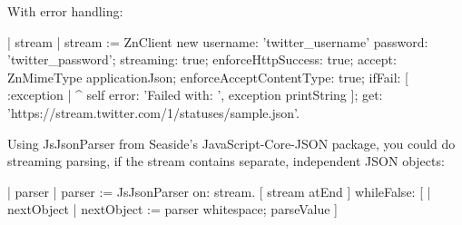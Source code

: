 \documentclass[a4paper,10pt,twoside]{book}
\begin{document}
With error handling:

\begin{code}
| stream |
stream := ZnClient new
	username: 'twitter_username' password: 'twitter_password';
	streaming: true;
	enforceHttpSuccess: true; 
	accept: ZnMimeType applicationJson;
	enforceAcceptContentType: true; 
	ifFail: [ :exception | ^ self error: 'Failed with: ', exception printString ]; 
	get: 'https://stream.twitter.com/1/statuses/sample.json'.
\end{code}

Using JsJsonParser from Seaside's JavaScript-Core-JSON package, you could do streaming parsing, if the stream contains separate, independent JSON objects:

\begin{code}
| parser |
parser := JsJsonParser on: stream.
[ stream atEnd ] whileFalse: [ | nextObject |
	nextObject := parser whitespace; parseValue ]
\end{code}






\ifx\wholebook\relax\else
\end{document}
